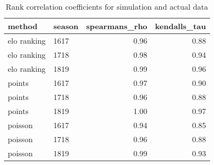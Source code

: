 \begin{table}[ht]
\centering
\begin{tabular}{llrr}
  \hline
method & season & spearmans\_rho & kendalls\_tau \\ 
  \hline
elo ranking & 1617 & 0.96 & 0.88 \\ 
  elo ranking & 1718 & 0.98 & 0.94 \\ 
  elo ranking & 1819 & 0.99 & 0.96 \\ 
  points & 1617 & 0.97 & 0.90 \\ 
  points & 1718 & 0.96 & 0.88 \\ 
  points & 1819 & 1.00 & 0.97 \\ 
  poisson & 1617 & 0.94 & 0.85 \\ 
  poisson & 1718 & 0.96 & 0.88 \\ 
  poisson & 1819 & 0.99 & 0.93 \\ 
   \hline
\end{tabular}
\caption{Rank correlation coefficients for simulation and actual data} 
\end{table} 
